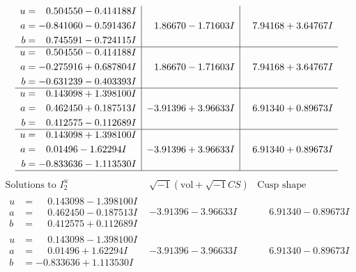 \documentclass[1p]{elsarticle_modified}
\theoremstyle{definition}
\newcommand{\I}{\sqrt{-1}}
\begin{document}
$$\begin{array}{c|c|c}
\begin{aligned}
u &= \phantom{-}0.504550 - 0.414188 I \\
a &= -0.841060 - 0.591436 I \\
b &= \phantom{-}0.745591 - 0.724115 I\end{aligned}
 & \phantom{-}1.86670 - 1.71603 I & \phantom{-}7.94168 + 3.64767 I \\ \hline\begin{aligned}
u &= \phantom{-}0.504550 - 0.414188 I \\
a &= -0.275916 + 0.687804 I \\
b &= -0.631239 - 0.403393 I\end{aligned}
 & \phantom{-}1.86670 - 1.71603 I & \phantom{-}7.94168 + 3.64767 I \\ \hline\begin{aligned}
u &= \phantom{-}0.143098 + 1.398100 I \\
a &= \phantom{-}0.462450 + 0.187513 I \\
b &= \phantom{-}0.412575 - 0.112689 I\end{aligned}
 & -3.91396 + 3.96633 I & \phantom{-}6.91340 + 0.89673 I \\ \hline\begin{aligned}
u &= \phantom{-}0.143098 + 1.398100 I \\
a &= \phantom{-}0.01496 - 1.62294 I \\
b &= -0.833636 - 1.113530 I\end{aligned}
 & -3.91396 + 3.96633 I & \phantom{-}6.91340 + 0.89673 I\\
 \hline 
 \end{array}$$\newpage$$\begin{array}{c|c|c}  
\text{Solutions to }I^u_{2}& \I (\text{vol} + \sqrt{-1}CS) & \text{Cusp shape}\\
 \hline 
\begin{aligned}
u &= \phantom{-}0.143098 - 1.398100 I \\
a &= \phantom{-}0.462450 - 0.187513 I \\
b &= \phantom{-}0.412575 + 0.112689 I\end{aligned}
 & -3.91396 - 3.96633 I & \phantom{-}6.91340 - 0.89673 I \\ \hline\begin{aligned}
u &= \phantom{-}0.143098 - 1.398100 I \\
a &= \phantom{-}0.01496 + 1.62294 I \\
b &= -0.833636 + 1.113530 I\end{aligned}
 & -3.91396 - 3.96633 I & \phantom{-}6.91340 - 0.89673 I \\ \hline\begin{aligned}

\end{aligned}
\end{array}$$
\end{document}
